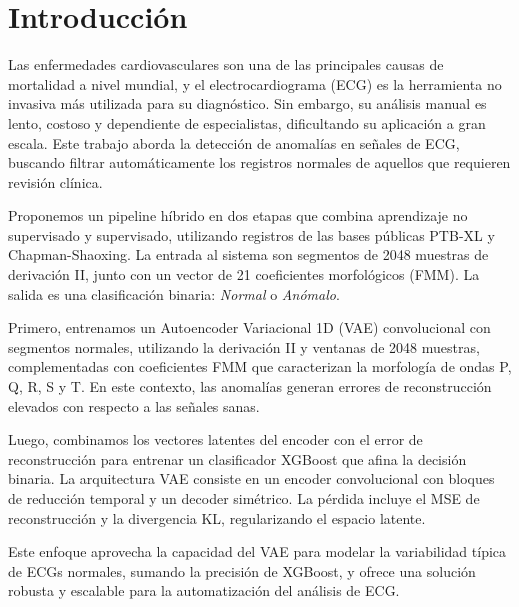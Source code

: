 \documentclass[11pt]{article}
\begin{document}
\section{Introducción}



Las enfermedades cardiovasculares son una de las principales causas de mortalidad a nivel mundial, y el electrocardiograma (ECG) es la herramienta no invasiva más utilizada para su diagnóstico. Sin embargo, su análisis manual es lento, costoso y dependiente de especialistas, dificultando su aplicación a gran escala. Este trabajo aborda la detección de anomalías en señales de ECG, buscando filtrar automáticamente los registros normales de aquellos que requieren revisión clínica.

Proponemos un pipeline híbrido en dos etapas que combina aprendizaje no supervisado y supervisado, utilizando registros de las bases públicas PTB-XL y Chapman-Shaoxing. La entrada al sistema son segmentos de 2048 muestras de derivación II, junto con un vector de 21 coeficientes morfológicos (FMM). La salida es una clasificación binaria: \textit{Normal} o \textit{Anómalo}.

Primero, entrenamos un Autoencoder Variacional 1D (VAE) convolucional con segmentos normales, utilizando la derivación II y ventanas de 2048 muestras, complementadas con coeficientes FMM que caracterizan la morfología de ondas P, Q, R, S y T. En este contexto, las anomalías generan errores de reconstrucción elevados con respecto a las señales sanas.

Luego, combinamos los vectores latentes del encoder con el error de reconstrucción para entrenar un clasificador XGBoost que afina la decisión binaria. La arquitectura VAE consiste en un encoder convolucional con bloques de reducción temporal y un decoder simétrico. La pérdida incluye el MSE de reconstrucción y la divergencia KL, regularizando el espacio latente.

Este enfoque aprovecha la capacidad del VAE para modelar la variabilidad típica de ECGs normales, sumando la precisión de XGBoost, y ofrece una solución robusta y escalable para la automatización del análisis de ECG.
\end{document}
